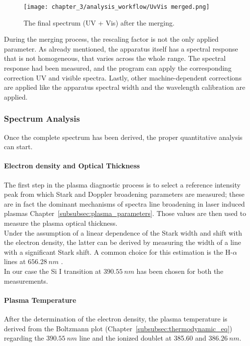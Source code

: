 \begin{figure}[H]
    \centering
    \texttt{[image: chapter\_3/analysis\_workflow/UvVis merged.png]} 
    \caption{The final spectrum (UV + Vis) after the merging. }
    \label{fig:merged_sepctrum}
\end{figure}

During the merging process, the rescaling factor is not the only applied parameter. As already mentioned, the apparatus itself has a spectral response that is not homogeneous, that varies across the whole range. The spectral response had been measured, and the program can apply the corresponding correction UV and visible spectra. Lastly, other machine-dependent corrections are applied like the apparatus spectral width and the wavelength calibration are applied.

\subsubsection{Spectrum Analysis}
\label{subsubsec:spectrum_analysis}
Once the complete spectrum has been derived, the proper quantitative analysis can start. 

\paragraph{Electron density and Optical Thickness}
\label{par:electron_density_opt_thick}
The first step in the plasma diagnostic process is to select a reference intensity peak from which Stark and Doppler broadening parameters are measured; these are in fact the dominant mechanisms of spectra line broadening in laser induced plasmas Chapter~\ref{subsubsec:plasma_parameters}. Those values are then used to measure the plasma optical thickness.
\\
Under the assumption of a linear dependence of the Stark width and shift with the electron density, the latter can be derived by measuring the width of a line with a significant Stark shift. A common choice for this estimation is the H-$\alpha$ lines at $656.28\:nm$ \cite{gerhardQuantitativeAnalysesGlass2014}.
\\
In our case the Si I transition at $390.55 \: nm$ has been chosen for both the measurements.
\paragraph{Plasma Temperature}
\label{par:plasma_temperature}
After the determination of the electron density, the plasma temperature is derived from the Boltzmann plot (Chapter~\ref{subsubsec:thermodynamic_eq}) regarding the  $390.55\:nm$ line and the ionized  doublet at 385.60 and $386.26\:nm$.


